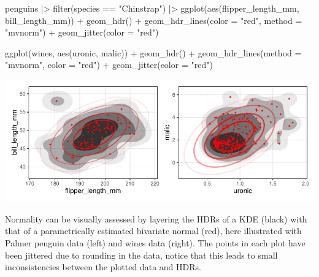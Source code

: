 \pagebreak

\begin{knitrout}
\color{fgcolor}\begin{kframe}
\begin{example}
penguins |>
  filter(species == "Chinstrap") |>
  ggplot(aes(flipper_length_mm, bill_length_mm)) +
  geom_hdr() +
  geom_hdr_lines(color = "red", method = "mvnorm") +
  geom_jitter(color = "red")
\end{example}
\end{kframe}
\end{knitrout}

\begin{knitrout}
\color{fgcolor}\begin{kframe}
\begin{example}
ggplot(wines, aes(uronic, malic)) +
  geom_hdr() +
  geom_hdr_lines(method = "mvnorm", color = "red") +
  geom_jitter(color = "red")
\end{example}
\end{kframe}
\end{knitrout}


\begin{knitrout}
\color{fgcolor}\begin{widefigure}[h!]

{\centering \includegraphics[width=\maxwidth]{figures/normality_create_vis-1}

}

\caption{Normality can be visually assessed by layering the HDRs of a KDE (black) with that of a parametrically estimated bivariate normal (red), here illustrated with Palmer penguin data (left) and wines data (right). The points in each plot have been jittered due to rounding in the data, notice that this leads to small inconsistencies between the plotted data and HDRs.}\label{fig:normality_create_vis}
\end{widefigure}

\end{knitrout}

